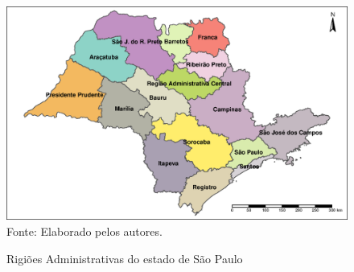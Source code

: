 
\begin{appendices}
\setcounter{table}{0}
\setcounter{figure}{0}

\renewcommand{\thetable}{A\arabic{table}}
\renewcommand{\thefigure}{A\arabic{figure}}

\section{}\label{ap1}

\begin{figure}[H]
        \centering
        	\begin{minipage}{0.8\textwidth}	
                \caption{Rigiões Administrativas do estado de São Paulo}
                \includegraphics[scale=0.6]{figures/m2.eps}                 
            	\footnotesize \\
            		Fonte: Elaborado pelos autores.
    	\label{f:maps2}
	\end{minipage}
\end{figure}

\end{appendices}
